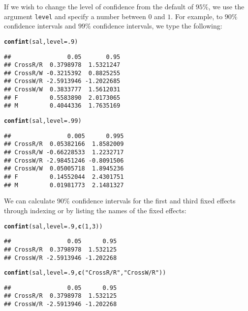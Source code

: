 \documentclass[11pt]{article}\usepackage[]{graphicx}\usepackage[]{color}
\makeatletter
\newcommand{\hlnum}[1]{\textcolor[rgb]{0.686,0.059,0.569}{#1}}%
\newcommand{\hlstr}[1]{\textcolor[rgb]{0.192,0.494,0.8}{#1}}%
\newcommand{\hlstd}[1]{\textcolor[rgb]{0.345,0.345,0.345}{#1}}%
\newcommand{\hlkwc}[1]{\textcolor[rgb]{0.333,0.667,0.333}{#1}}%
\newcommand{\hlkwd}[1]{\textcolor[rgb]{0.737,0.353,0.396}{\textbf{#1}}}%
\newenvironment{kframe}{%
 \def\at@end@of@kframe{}%
 \ifinner\ifhmode%
  \def\at@end@of@kframe{\end{minipage}}%
  \begin{minipage}{\columnwidth}%
 \fi\fi%
 \def\FrameCommand##1{\hskip\@totalleftmargin \hskip-\fboxsep
 \colorbox{shadecolor}{##1}\hskip-\fboxsep
     \hskip-\linewidth \hskip-\@totalleftmargin \hskip\columnwidth}%
 \MakeFramed {\advance\hsize-\width
   \@totalleftmargin\z@ \linewidth\hsize
   \@setminipage}}%
 {\par\unskip\endMakeFramed%
 \at@end@of@kframe}
\newenvironment{knitrout}{}{} %
\makeatother
\begin{document}
If we wish to change the level of confidence from the default of $95\%$, we use the argument \texttt{level} and specify a number between $0$ and $1$. For example, to $90\%$ confidence intervals and $99\%$ confidence intervals, we type the following:
\begin{knitrout}
\color{fgcolor}\begin{kframe}
\begin{alltt}
\hlkwd{confint}\hlstd{(sal,}\hlkwc{level}\hlstd{=}\hlnum{.9}\hlstd{)}
\end{alltt}
\begin{verbatim}
##                0.05       0.95
## CrossR/R  0.3798978  1.5321247
## CrossR/W -0.3215392  0.8825255
## CrossW/R -2.5913946 -1.2022685
## CrossW/W  0.3833777  1.5612031
## F         0.5583890  2.0173065
## M         0.4044336  1.7635169
\end{verbatim}
\begin{alltt}
\hlkwd{confint}\hlstd{(sal,}\hlkwc{level}\hlstd{=}\hlnum{.99}\hlstd{)}
\end{alltt}
\begin{verbatim}
##                0.005      0.995
## CrossR/R  0.05382166  1.8582009
## CrossR/W -0.66228533  1.2232717
## CrossW/R -2.98451246 -0.8091506
## CrossW/W  0.05005718  1.8945236
## F         0.14552044  2.4301751
## M         0.01981773  2.1481327
\end{verbatim}
\end{kframe}
\end{knitrout}

We can calculate $90\%$ confidence intervals for the first and third fixed effects through indexing or by listing the names of the fixed effects:
\begin{knitrout}
\color{fgcolor}\begin{kframe}
\begin{alltt}
\hlkwd{confint}\hlstd{(sal,}\hlkwc{level}\hlstd{=}\hlnum{.9}\hlstd{,}\hlkwd{c}\hlstd{(}\hlnum{1}\hlstd{,}\hlnum{3}\hlstd{))}
\end{alltt}
\begin{verbatim}
##                0.05      0.95
## CrossR/R  0.3798978  1.532125
## CrossW/R -2.5913946 -1.202268
\end{verbatim}
\begin{alltt}
\hlkwd{confint}\hlstd{(sal,}\hlkwc{level}\hlstd{=}\hlnum{.9}\hlstd{,}\hlkwd{c}\hlstd{(}\hlstr{"CrossR/R"}\hlstd{,}\hlstr{"CrossW/R"}\hlstd{))}
\end{alltt}
\begin{verbatim}
##                0.05      0.95
## CrossR/R  0.3798978  1.532125
## CrossW/R -2.5913946 -1.202268
\end{verbatim}
\end{kframe}
\end{knitrout}
\end{document}
